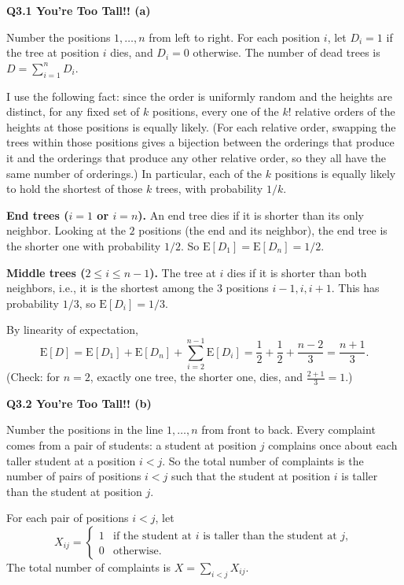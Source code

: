 \documentclass[11pt]{article}
\newcommand{\Ex}{\mathrm{E}}
\newcommand{\qpage}[1]{\clearpage\noindent\textbf{\large #1}\par\medskip}
\begin{document}
\qpage{Q3.1 You're Too Tall!! (a)}

Number the positions $1, \ldots, n$ from left to right.
For each position $i$, let $D_i = 1$ if the tree at position $i$ dies, and $D_i = 0$ otherwise.
The number of dead trees is $D = \sum_{i=1}^n D_i$.

I use the following fact: since the order is uniformly random and the heights are distinct, for any fixed set of $k$ positions, every one of the $k!$ relative orders of the heights at those positions is equally likely.
(For each relative order, swapping the trees within those positions gives a bijection between the orderings that produce it and the orderings that produce any other relative order, so they all have the same number of orderings.)
In particular, each of the $k$ positions is equally likely to hold the shortest of those $k$ trees, with probability $1/k$.

\textbf{End trees ($i = 1$ or $i = n$).}
An end tree dies if it is shorter than its only neighbor.
Looking at the $2$ positions (the end and its neighbor), the end tree is the shorter one with probability $1/2$.
So $\Ex[D_1] = \Ex[D_n] = 1/2$.

\textbf{Middle trees ($2 \leq i \leq n-1$).}
The tree at $i$ dies if it is shorter than both neighbors, i.e., it is the shortest among the $3$ positions $i-1, i, i+1$.
This has probability $1/3$, so $\Ex[D_i] = 1/3$.

By linearity of expectation,
\[
  \Ex[D] = \Ex[D_1] + \Ex[D_n] + \sum_{i=2}^{n-1} \Ex[D_i] = \frac{1}{2} + \frac{1}{2} + \frac{n-2}{3} = \frac{n+1}{3}.
\]
(Check: for $n = 2$, exactly one tree, the shorter one, dies, and $\frac{2+1}{3} = 1$.)

\qpage{Q3.2 You're Too Tall!! (b)}

Number the positions in the line $1, \ldots, n$ from front to back.
Every complaint comes from a pair of students: a student at position $j$ complains once about each taller student at a position $i < j$.
So the total number of complaints is the number of pairs of positions $i < j$ such that the student at position $i$ is taller than the student at position $j$.

For each pair of positions $i < j$, let
\[
  X_{ij} = \begin{cases} 1 & \text{if the student at } i \text{ is taller than the student at } j, \\ 0 & \text{otherwise.} \end{cases}
\]
The total number of complaints is $X = \sum_{i < j} X_{ij}$.
\end{document}
